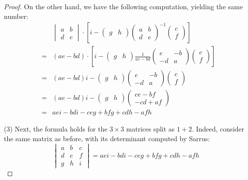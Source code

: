 \documentclass[12pt]{amsbook}
\begin{document}
\begin{proof}
On the other hand, we have the following computation, yielding the same number:
\begin{eqnarray*}
&&\begin{vmatrix}
a&b\\ d&e\end{vmatrix}\cdot
\left[i-\begin{pmatrix}g&h\end{pmatrix}
\begin{pmatrix}
a&b\\ d&e\end{pmatrix}^{-1}
\begin{pmatrix}
c\\
f\end{pmatrix}\right]\\
&=&(ae-bd)\cdot
\left[i-\begin{pmatrix}g&h\end{pmatrix}
\frac{1}{ae-bd}
\begin{pmatrix}
e&-b\\ -d&a\end{pmatrix}
\begin{pmatrix}
c\\
f\end{pmatrix}\right]\\
&=&(ae-bd)i-\begin{pmatrix}g&h\end{pmatrix}
\begin{pmatrix}
e&-b\\ -d&a\end{pmatrix}
\begin{pmatrix}
c\\
f\end{pmatrix}\\
&=&(ae-bd)i-\begin{pmatrix}g&h\end{pmatrix}
\begin{pmatrix}
ce-bf\\ -cd+af\end{pmatrix}\\
&=&aei-bdi-ceg+bfg+cdh-afh
\end{eqnarray*}

(3) Next, the formula holds for the $3\times3$ matrices split as $1+2$. Indeed, consider the same matrix as before, with its determinant computed by Sarrus:
$$\begin{vmatrix}
a&b&c\\ d&e&f\\ g&h&i\end{vmatrix}
=aei-bdi-ceg+bfg+cdh-afh$$


\end{proof}
\end{document}
